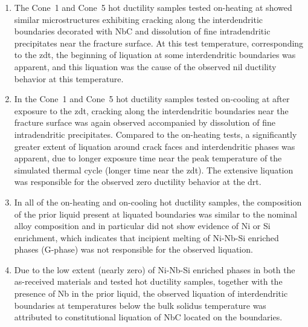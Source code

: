 \begin{enumerate}
\item The Cone~1 and Cone~5 hot ductility samples tested on-heating at  showed similar microstructures exhibiting cracking along the interdendritic boundaries decorated with NbC and dissolution of fine intradendritic precipitates near the fracture surface. At this test temperature, corresponding to the \gls{zdt}, the beginning of liquation at some interdendritic boundaries was apparent, and this liquation was the cause of the observed nil ductility behavior at this temperature.
\item In the Cone~1 and Cone~5 hot ductility samples tested on-cooling at  after exposure to the \gls{zdt}, cracking along the interdendritic boundaries near the fracture surface was again observed accompanied by dissolution of fine intradendritic precipitates. Compared to the on-heating tests, a significantly greater extent of liquation around crack faces and interdendritic phases was apparent, due to longer exposure time near the peak temperature of the simulated thermal cycle (longer time near the \gls{zdt}). The extensive liquation was responsible for the observed zero ductility behavior at the \gls{drt}.
\item In all of the on-heating and on-cooling hot ductility samples, the composition of the prior liquid present at liquated boundaries was similar to the nominal alloy composition and in particular did not show evidence of Ni or Si enrichment, which indicates that incipient melting of Ni-Nb-Si enriched phases (G-phase) was not responsible for the observed liquation.
\item Due to the low extent (nearly zero) of Ni-Nb-Si enriched phases in both the as-received materials and tested hot ductility samples, together with the presence of Nb in the prior liquid, the observed liquation of interdendritic boundaries at temperatures below the bulk solidus temperature was attributed to constitutional liquation of NbC located on the boundaries.

\end{enumerate}


